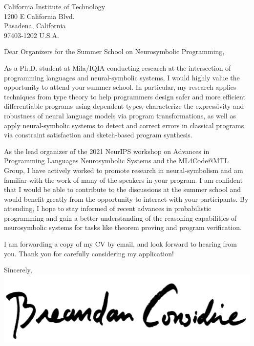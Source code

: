 \documentclass{letter}
\begin{document}
    \begin{letter}{California Institute of Technology\\1200 E California Blvd.\\Pasadena, California\\97403-1202 U.S.A.}
        \opening{Dear Organizers for the Summer School on Neurosymbolic Programming,}
        As a Ph.D. student at Mila/IQIA conducting research at the intersection of programming languages and neural-symbolic systems, I would highly value the opportunity to attend your summer school. In particular, my research applies techniques from type theory to help programmers design safer and more efficient differentiable programs using dependent types, characterize the expressivity and robustness of neural language models via program transformations, as well as apply neural-symbolic systems to detect and correct errors in classical programs via constraint satisfaction and sketch-based program synthesis.

        As the lead organizer of the 2021 NeurIPS workshop on Advances in Programming Languages Neurosymbolic Systems and the ML4Code@MTL Group, I have actively worked to promote research in neural-symbolism and am familiar with the work of many of the speakers in your program. I am confident that I would be able to contribute to the discussions at the summer school and would benefit greatly from the opportunity to interact with your participants. By attending, I hope to stay informed of recent advances in probabilistic programming and gain a better understanding of the reasoning capabilities of neurosymbolic systems for tasks like theorem proving and program verification.

        I am forwarding a copy of my CV by email, and look forward to hearing from you. Thank you for carefully considering my application!
        \closing{Sincerely,\\
        \includegraphics[scale=0.06]{signature}\\
        }
    \end{letter}
\end{document}
